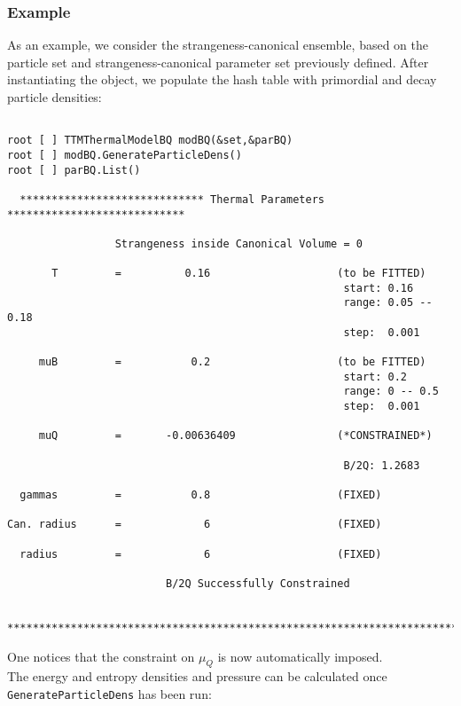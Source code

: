 \documentclass{elsarticle}
\begin{document}
\subsubsection{Example}

As an example, we consider the strangeness-canonical ensemble, based on the particle set and 
strangeness-canonical parameter set previously defined. After instantiating the object, we populate the hash table 
with primordial and decay particle densities:

\small
\begin{verbatim}

root [ ] TTMThermalModelBQ modBQ(&set,&parBQ)
root [ ] modBQ.GenerateParticleDens()
root [ ] parBQ.List()

  ***************************** Thermal Parameters ****************************

                 Strangeness inside Canonical Volume = 0

       T         =          0.16                    (to be FITTED)
                                                     start: 0.16
                                                     range: 0.05 -- 0.18
                                                     step:  0.001

     muB         =           0.2                    (to be FITTED)
                                                     start: 0.2
                                                     range: 0 -- 0.5
                                                     step:  0.001

     muQ         =       -0.00636409                (*CONSTRAINED*)

                                                     B/2Q: 1.2683

  gammas         =           0.8                    (FIXED)

Can. radius      =             6                    (FIXED)

  radius         =             6                    (FIXED)

                         B/2Q Successfully Constrained

  ******************************************************************************
\end{verbatim}
\normalsize

\noindent 
One notices that the constraint on $\mu_Q$ is now automatically 
imposed.\\ 

The energy and entropy densities and pressure can be calculated once \texttt{GenerateParticleDens} 
has been run:
\end{document}
